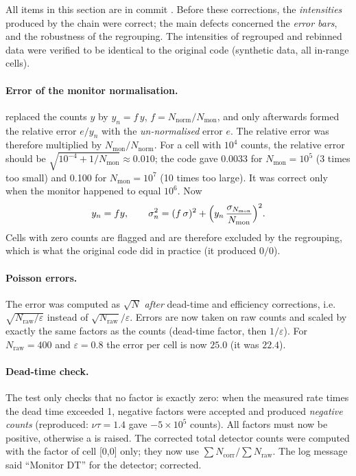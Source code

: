 \documentclass[11pt,a4paper]{article}
\begin{document}
\label{sec:reduction}

All items in this section are in commit . Before these
corrections, the \emph{intensities} produced by the chain were correct;
the main defects concerned the \emph{error bars}, and the robustness of
the regrouping. The intensities of regrouped and rebinned data were
verified to be identical to the original code (synthetic data, all
in-range cells).

\paragraph{ Error of the monitor normalisation.} \newbeh{}
 replaced the counts $y$ by $y_n = f\,y$, $f = N_\mathrm{norm}/N_\mathrm{mon}$,
and only afterwards formed the relative error $e/y_n$ with the
\emph{un-normalised} error $e$. The relative error was therefore multiplied
by $N_\mathrm{mon}/N_\mathrm{norm}$. For a cell with $10^4$ counts, the
relative error should be $\sqrt{10^{-4}+1/N_\mathrm{mon}}\approx 0.010$;
the code gave 0.0033 for $N_\mathrm{mon}=10^5$ (3 times too small) and
0.100 for $N_\mathrm{mon}=10^7$ (10 times too large). It was correct only
when the monitor happened to equal $10^6$. Now
\begin{equation}
  y_n = f y, \qquad \sigma_n^2 = (f\,\sigma)^2 + \Bigl(y_n\,\frac{\sigma_{N_\mathrm{mon}}}{N_\mathrm{mon}}\Bigr)^2 .
\end{equation}
Cells with zero counts are flagged  and are therefore excluded by
the regrouping, which is what the original code did in practice (it
produced $0/0$).

\paragraph{ Poisson errors.} \newbeh{} The error was computed as
$\sqrt{N}$ \emph{after} dead-time and efficiency corrections, i.e.\
$\sqrt{N_\mathrm{raw}/\varepsilon}$ instead of $\sqrt{N_\mathrm{raw}}/\varepsilon$.
Errors are now taken on raw counts and scaled by exactly the same factors
as the counts (dead-time factor, then $1/\varepsilon$). For
$N_\mathrm{raw}=400$ and $\varepsilon=0.8$ the error per cell is now
$25.0$ (it was $22.4$).

\paragraph{ Dead-time check.} The test
 only checks that no factor is exactly
zero: when the measured rate times the dead time exceeded 1, negative
factors were accepted and produced \emph{negative counts} (reproduced:
$\nu\tau = 1.4$ gave $-5\times10^5$ counts). All factors must now be
positive, otherwise a \code{ValueError} is raised. The corrected total
detector counts were computed with the factor of cell [0,0] only; they now
use $\sum N_\mathrm{corr}/\sum N_\mathrm{raw}$. The log message said
``Monitor DT'' for the detector; corrected.
\end{document}
